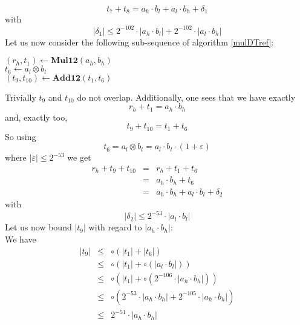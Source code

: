 \documentclass[a4paper,10pt,twoside]{article}
\newenvironment{proof}[1][Proof]{\begin{trivlist}
\item[\hskip \labelsep {\bfseries #1}]}{\end{trivlist}}
\newcommand{\hi}{\ensuremath{\mathit{h}}}
\newcommand{\lo}{\ensuremath{\mathit{l}}}
\newcommand{\mAdd}{\ensuremath{\mathbf{Add12}}}
\newcommand{\mMul}{\ensuremath{\mathbf{Mul12}}}
\renewcommand{\epsilon}{\varepsilon}
\begin{document}
\begin{proof}
$$t_7 + t_8 = a_\hi \cdot b_\lo + a_\lo \cdot b_\hi + \delta_1$$
with
$$\left \vert \delta_1 \right \vert \leq 2^{-102} \cdot \left \vert a_\hi \cdot b_\lo \right \vert +
                                         2^{-102} \cdot \left \vert a_\lo \cdot b_\hi \right \vert$$
Let us now consider the following sub-sequence of algorithm \ref{mulDTref}:
\begin{center}
\begin{minipage}[b]{50mm}
$\left( r_\hi, t_1 \right) \gets \mMul\left( a_\hi, b_\hi \right)$ \\
$t_6 \gets a_\lo \otimes b_\lo$ \\
$\left( t_9, t_{10} \right) \gets \mAdd\left( t_1, t_6 \right)$
\end{minipage}
\end{center}
Trivially $t_9$ and $t_{10}$ do not overlap.
Additionally, one sees that we have exactly
$$r_\hi + t_1 = a_\hi \cdot b_\hi$$
and, exactly too,
$$t_9 + t_{10} = t_1 + t_6$$
So using
$$t_6 = a_\lo \otimes b_\lo = a_\lo \cdot b_\lo \cdot \left( 1 + \epsilon \right)$$
where $\left \vert \epsilon \right \vert \leq 2^{-53}$ we get
\begin{eqnarray*}
r_\hi + t_9 + t_{10} & = & r_\hi + t_1 + t_6 \\
& = & a_\hi \cdot b_\hi + t_6 \\
& = & a_\hi \cdot b_\hi + a_\lo \cdot b_\lo + \delta_2
\end{eqnarray*}
with
$$\left \vert \delta_2 \right \vert \leq 2^{-53} \cdot \left \vert a_\lo \cdot b_\lo \right \vert$$
Let us now bound $\left \vert t_9 \right \vert$ with regard to $\left \vert a_\hi \cdot b_\hi \right \vert$:\\
We have
\begin{eqnarray*}
\left \vert t_9 \right \vert & \leq & \circ \left( \left \vert t_1 \right \vert + \left \vert t_6 \right \vert \right) \\
& \leq & \circ \left( \left \vert t_1 \right \vert + \circ \left( \left \vert a_\lo \cdot b_\lo \right \vert \right) \right) \\
& \leq & \circ \left( \left \vert t_1 \right \vert + \circ \left( 2^{-106} \cdot \left \vert a_\hi \cdot b_\hi \right \vert \right) \right) \\
& \leq & \circ \left( 2^{-53} \cdot \left \vert a_\hi \cdot b_\hi \right \vert + 2^{-105} \cdot \left \vert a_\hi \cdot b_\hi \right \vert \right) \\
& \leq & 2^{-51} \cdot \left \vert a_\hi \cdot b_\hi \right \vert
\end{eqnarray*}

\end{proof}
\end{document}
